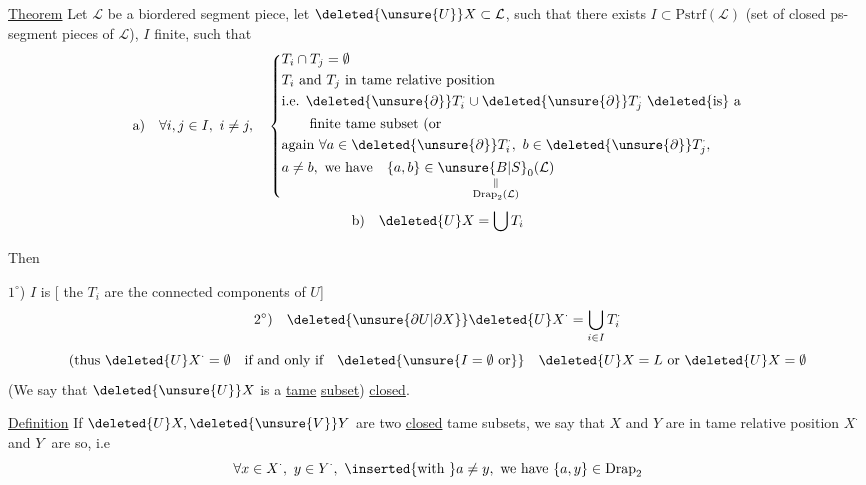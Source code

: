 \uline{Theorem} Let $\mathcal L$ be a biordered segment piece, let $\deleted{\unsure{U}}X\subset\mathcal L$, such that there exists $I\subset\mathrm{Pstrf}(\mathcal L)$ (set of closed ps-segment pieces of $\mathcal L$), $I$ finite,  such that
\[
\begin{aligned}
\text{a)}\quad \forall i,j\in I,\ i\ne j,\quad
\left\{\begin{aligned}
&T_i\cap T_j=\emptyset\\
&T_i\text{ and }T_j\text{ in tame relative position}\\
&\text{i.e. }\deleted{\unsure{\partial}}T_i^{\cdot}\cup \deleted{\unsure{\partial}}T_j^{\cdot}\ \text{\deleted{is} a}\\
&\qquad\text{finite tame subset (or}\\
&\text{again }\forall a\in\deleted{\unsure{\partial}}T_i^{\cdot},\ b\in\deleted{\unsure{\partial}}T_j^{\cdot},\\
&a\ne b,\ \text{we have}\quad\{a,b\}\in\underset{\substack{\Vert\\\mathrm{Drap}_2(\mathcal L)}}{\unsure{B|S}_{0}(\mathcal L)}
\end{aligned}\right.
\end{aligned}
\]
\[
\text{b)}\quad \deleted{U}X=\bigcup T_i
\]

Then

$1^\circ$) $I$ is  [ the $T_i$ are the connected components of $U$]
\[
\text{$2^\circ$)}\quad \deleted{\unsure{\partial U|\partial X}}\deleted{U}X^{\cdot}=\bigcup_{i\in I}T_i^{\cdot}
\]
\[
(\text{thus }\deleted{U}X^{\cdot}=\emptyset\quad\text{if and only if}\quad\deleted{\unsure{I=\emptyset\ \text{or}}}\quad\deleted{U}X=L\text{ or }\deleted{U}X=\emptyset
\]
(We say that $\deleted{\unsure{U}}X$ is a \uline{tame} \uline{subset}) \uline{closed}.

\uline{Definition} If $\deleted{U}X,\deleted{\unsure{V}}Y$ are two \uline{closed} tame subsets, we say that $X$ and $Y$ are in tame relative position $X^{\cdot}$ and $Y^{\cdot}$ are so, i.e
\[
\forall x\in X^{\cdot},\ y\in Y^{\cdot},\ \inserted{\text{with }}a\ne y,\ \text{we have }\{a,y\}\in\mathrm{Drap}_2
\]

